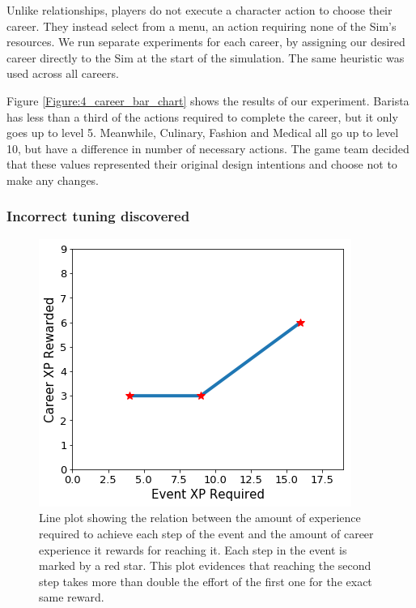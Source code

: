 \documentclass[letterpaper]{article} %
\begin{document}
Unlike relationships, players do not execute a character action to choose their career. They instead select from a menu, an action requiring none of the Sim's resources. We run separate experiments for each career, by assigning our desired career directly to the Sim at the start of the simulation. The same heuristic was used across all careers.

Figure \ref{Figure:4_career_bar_chart} shows the results of our experiment. Barista has less than a third of the actions required to complete the career, but it only goes up to level 5. Meanwhile, Culinary, Fashion and Medical all go up to level 10, but have a difference in number of necessary actions. The game team decided that these values represented their original design intentions and choose not to make any changes.

\subsubsection{Incorrect tuning discovered}

\begin{figure}[th]
  \centering
  \includegraphics[height=0.75\linewidth,width=1.0\linewidth]{images/Career_Star_XP_relation.png}
  \caption{Line plot showing the relation between the amount of experience required to achieve each step of the event and the amount of career experience it rewards for reaching it. Each step in the event is marked by a red star. This plot evidences that reaching the second step takes more than double the effort of the first one for the exact same reward.}
  \label{Figure:career_event_star_incorrect_tuning}
\end{figure}
\end{document}
